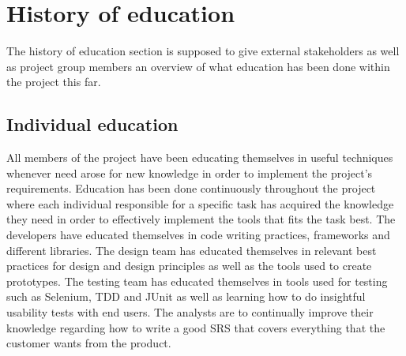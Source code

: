 
    \section{History of education}
    The history of education section is supposed to give external stakeholders as well as project group members an overview of what education has been done within the project this far. 

\subsection{Individual education}
All members of the project have been educating themselves in useful techniques whenever need arose for new knowledge in order to implement the project's requirements. Education has been done continuously throughout the project where each individual responsible for a specific task has acquired the knowledge they need in order to effectively implement the tools that fits the task best. The developers have educated themselves in code writing practices, frameworks and different libraries. The design team has educated themselves in relevant best practices for design and design principles as well as the tools used to create prototypes. The testing team has educated themselves in tools used for testing such as Selenium, TDD and JUnit as well as learning how to do insightful usability tests with end users. The analysts are to continually improve their knowledge regarding how to write a good SRS that covers everything that the customer wants from the product.

